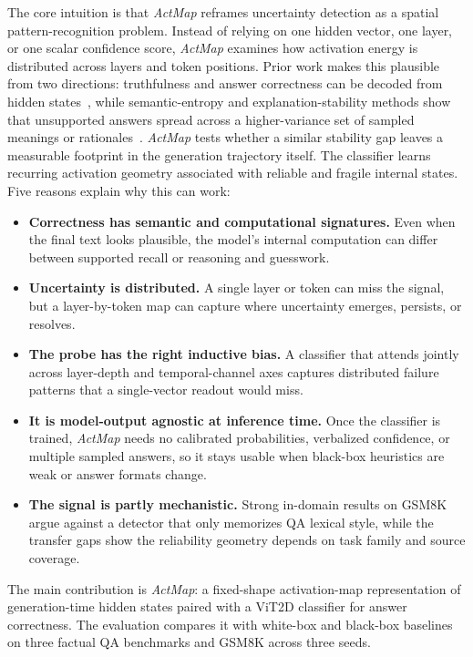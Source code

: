 \documentclass{article}
\newcommand{\actmap}{\textit{ActMap}}
\begin{document}
The core intuition is that \actmap{} reframes uncertainty detection as a spatial pattern-recognition problem. Instead of relying on one hidden vector, one layer, or one scalar confidence score, \actmap{} examines how activation energy is distributed across layers and token positions. Prior work makes this plausible from two directions: truthfulness and answer correctness can be decoded from hidden states~\cite{azaria2023,kadavath2022,marks2023,bhatnagar2026}, while semantic-entropy and explanation-stability methods show that unsupported answers spread across a higher-variance set of sampled meanings or rationales~\cite{becker2024,farquhar2024}. \actmap{} tests whether a similar stability gap leaves a measurable footprint in the generation trajectory itself. The classifier learns recurring activation geometry associated with reliable and fragile internal states. Five reasons explain why this can work:
\begin{itemize}
    \item \textbf{Correctness has semantic and computational signatures.} Even when the final text looks plausible, the model's internal computation can differ between supported recall or reasoning and guesswork.
    \item \textbf{Uncertainty is distributed.} A single layer or token can miss the signal, but a layer-by-token map can capture where uncertainty emerges, persists, or resolves.
    \item \textbf{The probe has the right inductive bias.} A classifier that attends jointly across layer-depth and temporal-channel axes captures distributed failure patterns that a single-vector readout would miss.
    \item \textbf{It is model-output agnostic at inference time.} Once the classifier is trained, \actmap{} needs no calibrated probabilities, verbalized confidence, or multiple sampled answers, so it stays usable when black-box heuristics are weak or answer formats change.
    \item \textbf{The signal is partly mechanistic.} Strong in-domain results on GSM8K argue against a detector that only memorizes QA lexical style, while the transfer gaps show the reliability geometry depends on task family and source coverage.
\end{itemize}

The main contribution is \actmap{}: a fixed-shape activation-map representation of generation-time hidden states paired with a ViT2D classifier for answer correctness. The evaluation compares it with white-box and black-box baselines on three factual QA benchmarks and GSM8K across three seeds.
\end{document}
